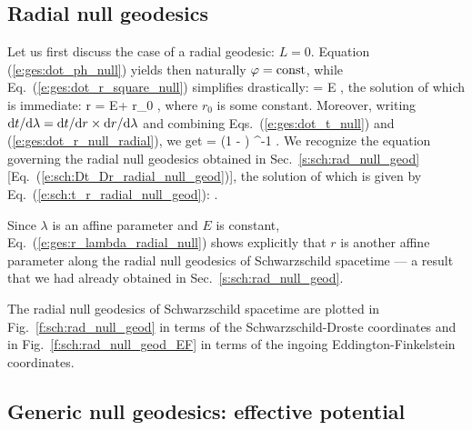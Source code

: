 \subsection{Radial null geodesics} \label{s:gis:radial}

Let us first discuss the case of a radial geodesic: $L=0$.
Equation (\ref{e:ges:dot_ph_null}) yields then naturally $\varphi=\mathrm{const}$,
while Eq.~(\ref{e:ges:dot_r_square_null}) simplifies drastically:
\be \label{e:ges:dot_r_null_radial}
     = \pm E ,
\ee
the solution of which is immediate:
\be \label{e:ges:r_lambda_radial_null}
    r = \pm E\lambda + r_0 ,
\ee
where $r_0$ is some constant.
Moreover, writing $\mathrm{d} t/\mathrm{d}\lambda = \mathrm{d} t/\mathrm{d} r \times \mathrm{d} r/\mathrm{d}\lambda$
and combining Eqs.~(\ref{e:ges:dot_t_null}) and (\ref{e:ges:dot_r_null_radial}),
we get
\be
     = \pm \left(1 -  \right) ^{-1} .
\ee
We recognize the equation governing the radial null geodesics obtained in
Sec.~\ref{s:sch:rad_null_geod} [Eq.~(\ref{e:sch:Dt_Dr_radial_null_geod})],
the solution of which is given by Eq.~(\ref{e:sch:t_r_radial_null_geod}):
\be
   .
\ee

\begin{remark}
Since $\lambda$ is an affine parameter and $E$ is constant,
Eq.~(\ref{e:ges:r_lambda_radial_null})
shows explicitly that $r$ is another affine parameter along the radial null
geodesics of Schwarzschild spacetime --- a result that we had already
obtained in Sec.~\ref{s:sch:rad_null_geod}.
\end{remark}

The radial null geodesics of Schwarzschild spacetime are plotted in
Fig.~\ref{f:sch:rad_null_geod} in terms of the Schwarzschild-Droste coordinates
and in Fig.~\ref{f:sch:rad_null_geod_EF} in terms of the ingoing Eddington-Finkelstein coordinates.



\subsection{Generic null geodesics: effective potential}
\label{s:ges:null_eff_pot}

